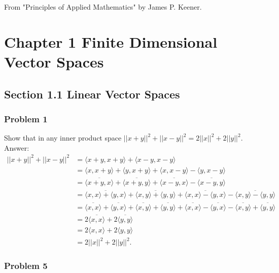 \documentclass{article}
\begin{document}
From "Principles of Applied Mathematics" by James P. Keener.

\section*{Chapter 1 Finite Dimensional Vector Spaces}

\subsection*{Section 1.1 Linear Vector Spaces}

\subsubsection*{Problem 1}

Show that in any inner product space $||x+y||^2 + ||x-y||^2 = 2||x||^2 + 2||y||^2$.\\

Answer:
\begin{align*}
||x+y||^2 + ||x-y||^2 &= \langle x+y, x+y \rangle + \langle x-y , x-y\rangle \\
&= \langle x, x+y \rangle + \langle y, x+y \rangle + \langle x , x-y \rangle - \langle y, x-y \rangle \\
&= \overline{\langle x + y , x \rangle} + \overline{\langle x+y, y \rangle} + \overline{\langle x - y , x \rangle} - \overline{\langle x-y, y \rangle} \\
&= \overline{\langle x, x \rangle + \langle y, x \rangle} + \overline{\langle x , y \rangle + \langle y , y \rangle}+ \overline{\langle x , x \rangle - \langle y , x \rangle} - \overline{\langle x , y \rangle - \langle y , y \rangle} \\
&= \overline{\langle x, x \rangle} + \overline{\langle y, x \rangle} + \overline{\langle x , y \rangle} + \overline{\langle y , y \rangle}+ \overline{\langle x , x \rangle} - \overline{\langle y , x \rangle} - \overline{\langle x , y \rangle} + \overline{\langle y , y \rangle} \\
&= 2\overline{\langle x, x \rangle} +  2\overline{\langle y , y \rangle} \\
&= 2\langle x , x\rangle + 2 \langle y, y \rangle \\
&= 2||x||^2 + 2||y||^2.
\end{align*}

\subsubsection*{Problem 5}
\end{document}
